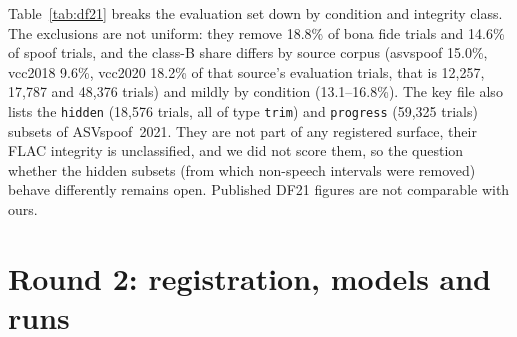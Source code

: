 \documentclass[10pt]{article}
\newcommand{\wide}[1]{\begingroup\footnotesize\setlength{\tabcolsep}{3.5pt}\resizebox{\textwidth}{!}{}\endgroup}
\begin{document}
Table~\ref{tab:df21} breaks the evaluation set down by condition and integrity class. The exclusions are not uniform: they remove 18.8\% of bona
fide trials and 14.6\% of spoof trials, and the class-B share differs by source corpus (asvspoof 15.0\%, vcc2018 9.6\%, vcc2020 18.2\%
of that source's evaluation trials, that is 12,257, 17,787 and 48,376 trials) and mildly by condition (13.1--16.8\%). The key file also lists the
\texttt{hidden} (18,576 trials, all of type \texttt{trim}) and \texttt{progress} (59,325 trials) subsets of ASVspoof~2021. They are not part of any
registered surface, their FLAC integrity is unclassified, and we did not score them, so the question whether the hidden subsets (from which
non-speech intervals were removed) behave differently remains open. Published DF21 figures are not comparable with ours.

\begin{table}[!ht]
\caption{DF21 evaluation trials by media condition and FLAC integrity class: class A (libFLAC 1.4 rejects the file, 1.3 decodes it and the MD5
verifies), class B (MD5 fails), the verified subset (evaluation minus B) and the clean subset (evaluation minus A and B).}
\label{tab:df21}
\centering
\wide{s_tab_df21}
\end{table}

\section{Round 2: registration, models and runs}
\label{sec:r2design}
\end{document}
